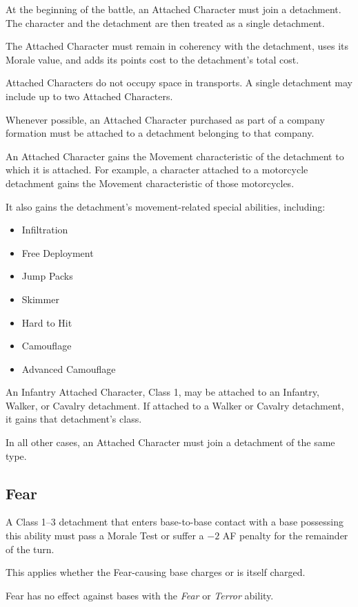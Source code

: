 At the beginning of the battle, an Attached Character must join a detachment. The character and the detachment are then treated as a single detachment.

The Attached Character must remain in coherency with the detachment, uses its Morale value, and adds its points cost to the detachment's total cost.

Attached Characters do not occupy space in transports. A single detachment may include up to two Attached Characters.

Whenever possible, an Attached Character purchased as part of a company formation must be attached to a detachment belonging to that company.

An Attached Character gains the Movement characteristic of the detachment to which it is attached. For example, a character attached to a motorcycle detachment gains the Movement characteristic of those motorcycles.

It also gains the detachment's movement-related special abilities, including:

\begin{itemize}
    \item Infiltration
    \item Free Deployment
    \item Jump Packs
    \item Skimmer
    \item Hard to Hit
    \item Camouflage
    \item Advanced Camouflage
\end{itemize}

An Infantry Attached Character, Class 1, may be attached to an Infantry, Walker, or Cavalry detachment. If attached to a Walker or Cavalry detachment, it gains that detachment's class.

In all other cases, an Attached Character must join a detachment of the same type.

\subsection{Fear}

A Class 1--3 detachment that enters base-to-base contact with a base possessing this ability must pass a Morale Test or suffer a $-2$ AF penalty for the remainder of the turn.

This applies whether the Fear-causing base charges or is itself charged.

Fear has no effect against bases with the \textit{Fear} or \textit{Terror} ability.

